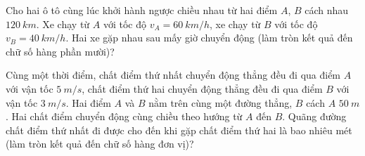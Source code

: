 \begin{ex}
Cho hai ô tô cùng lúc khởi hành ngược chiều nhau từ hai điểm $A$, $B$ cách nhau $120\ km$. Xe chạy từ $A$ với tốc độ $v_{A}=60\ km / h$, xe chạy từ $B$ với tốc độ $v_{B}=40\ km / h$. Hai xe gặp nhau sau mấy giờ chuyển động (làm tròn kết quả đến chữ số hàng phần mười)?
\loigiai{}
\end{ex}
\begin{ex}
Cùng một thời điểm, chất điểm thứ nhất chuyển động thẳng đều đi qua điểm $A$ với vận tốc $5 \ m/s$, chất điểm thứ hai chuyển động thẳng đều đi qua điểm $B$ với vận tốc $3 \ m/s$. Hai điểm $A$ và $B$ nằm trên cùng một đường thẳng, $B$ cách $A$ $50\ m$. Hai chất điểm chuyển động cùng chiều theo hướng từ $A$ đến $B$. Quãng đường chất điểm thứ nhất đi được cho đến khi gặp chất điểm thứ hai là bao nhiêu mét (làm tròn kết quả đến chữ số hàng đơn vị)?
\loigiai{}
\end{ex}

\begin{ex}
\loigiai{}
\end{ex}






